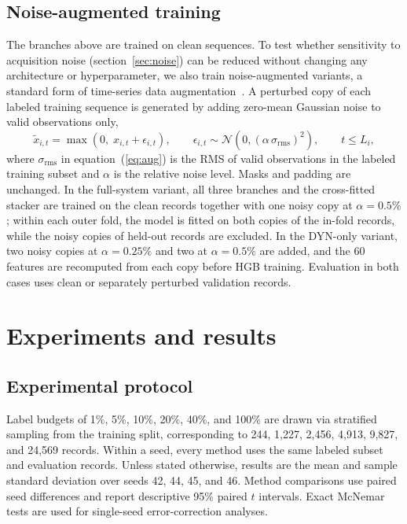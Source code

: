 \documentclass{iopjournal}
\begin{document}
\subsection{Noise-augmented training}\label{sec:aug}

The branches above are trained on clean sequences. To test whether sensitivity to acquisition noise (section~\ref{sec:noise}) can be reduced without changing any architecture or hyperparameter, we also train noise-augmented variants, a standard form of time-series data augmentation~\cite{wen2021}. A perturbed copy of each labeled training sequence is generated by adding zero-mean Gaussian noise to valid observations only,
\begin{equation}
\tilde{x}_{i,t}=\max\!\left(0,\;x_{i,t}+\epsilon_{i,t}\right),\qquad \epsilon_{i,t}\sim\mathcal{N}\!\left(0,(\alpha\,\sigma_{\mathrm{rms}})^2\right),\qquad t\le L_i,
\label{eq:aug}
\end{equation}
where $\sigma_{\mathrm{rms}}$ in equation~(\ref{eq:aug}) is the RMS of valid observations in the labeled training subset and $\alpha$ is the relative noise level. Masks and padding are unchanged. In the full-system variant, all three branches and the cross-fitted stacker are trained on the clean records together with one noisy copy at $\alpha=0.5\%$; within each outer fold, the model is fitted on both copies of the in-fold records, while the noisy copies of held-out records are excluded. In the DYN-only variant, two noisy copies at $\alpha=0.25\%$ and two at $\alpha=0.5\%$ are added, and the 60 features are recomputed from each copy before HGB training. Evaluation in both cases uses clean or separately perturbed validation records.

\section{Experiments and results}\label{sec:exp}

\subsection{Experimental protocol}\label{sec:protocol}

Label budgets of 1\%, 5\%, 10\%, 20\%, 40\%, and 100\% are drawn via stratified sampling from the training split, corresponding to 244, 1,227, 2,456, 4,913, 9,827, and 24,569 records. Within a seed, every method uses the same labeled subset and evaluation records. Unless stated otherwise, results are the mean and sample standard deviation over seeds 42, 44, 45, and 46. Method comparisons use paired seed differences and report descriptive 95\% paired $t$ intervals. Exact McNemar tests are used for single-seed error-correction analyses.
\end{document}
